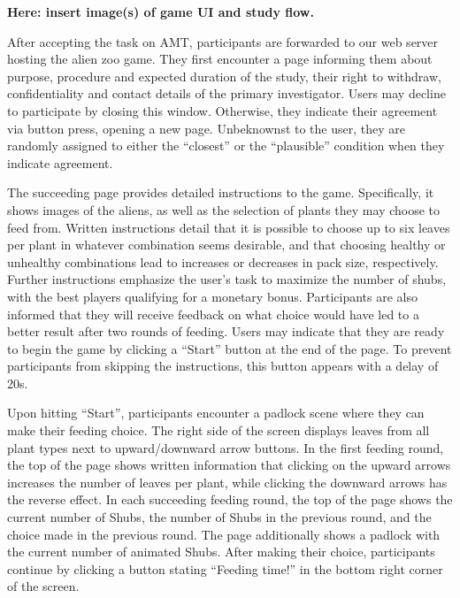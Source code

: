 \textbf{Here: insert image(s) of game UI and study flow.}

After accepting the task on \gls{AMT}, participants are forwarded to our web server hosting the alien zoo game.
They first encounter a page informing them about purpose, procedure and expected duration of the study, their right to withdraw, confidentiality and contact details of the primary investigator.
Users may decline to participate by closing this window.
Otherwise, they indicate their agreement via button press, opening a new page.
Unbeknownst to the user, they are randomly assigned to either the ``closest'' or the ``plausible'' condition when they indicate agreement.

The succeeding page provides detailed instructions to the game. 
Specifically, it shows images of the aliens, as well as the selection of plants they may choose to feed from.
Written instructions detail that it is possible to choose up to six leaves per plant in whatever combination seems desirable, and that choosing healthy or unhealthy combinations lead to increases or decreases in pack size, respectively.
Further instructions emphasize the user's task to maximize the number of shubs, with the best players qualifying for a monetary bonus.
Participants are also informed that they will receive feedback on what choice would have led to a better result after two rounds of feeding.
Users may indicate that they are ready to begin the game by clicking a ``Start'' button at the end of the page.
To prevent participants from skipping the instructions, this button appears with a delay of 20s.

Upon hitting ``Start'', participants encounter a padlock scene where they can make their feeding choice.
The right side of the screen displays leaves from all plant types next to upward/downward arrow buttons. 
In the first feeding round, the top of the page shows written information that clicking on the upward arrows increases the number of leaves per plant, while clicking the downward arrows has the reverse effect.
In each succeeding feeding round, the top of the page shows the current number of Shubs, the number of Shubs in the previous round, and the choice made in the previous round.
The page additionally shows a padlock with the current number of animated Shubs.
After making their choice, participants continue by clicking a button stating ``Feeding time!'' in the bottom right corner of the screen.

